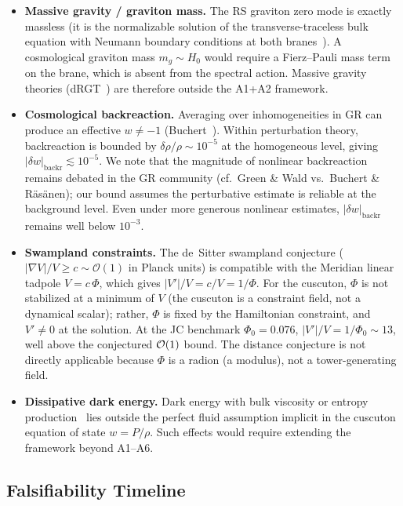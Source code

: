 \begin{itemize}
  \item \textbf{Massive gravity / graviton mass.} The RS graviton zero mode is exactly massless (it is the normalizable solution of the transverse-traceless bulk equation with Neumann boundary conditions at both branes~\cite{ch3:randall-sundrum1999}). A cosmological graviton mass $m_g \sim H_0$ would require a Fierz--Pauli mass term on the brane, which is absent from the spectral action. Massive gravity theories (dRGT~\cite{ch3:deRhamGabadadzeTolley2011}) are therefore outside the A1+A2 framework.

  \item \textbf{Cosmological backreaction.} Averaging over inhomogeneities in GR can produce an effective $w \neq -1$ (Buchert~\cite{ch3:buchert2000,ch3:buchert2008}). Within perturbation theory, backreaction is bounded by $\delta\rho/\rho \sim 10^{-5}$ at the homogeneous level, giving $|\delta w|_{\mathrm{backr}} \lesssim 10^{-5}$. We note that the magnitude of nonlinear backreaction remains debated in the GR community (cf.\ Green \& Wald vs.\ Buchert \& R\"as\"anen); our bound assumes the perturbative estimate is reliable at the background level. Even under more generous nonlinear estimates, $|\delta w|_{\mathrm{backr}}$ remains well below $10^{-3}$.

  \item \textbf{Swampland constraints.} The de~Sitter swampland conjecture ($|\nabla V|/V \geq c \sim \mathcal{O}(1)$ in Planck units) is compatible with the Meridian linear tadpole $V = c\,\Phi$, which gives $|V'|/V = c/V = 1/\Phi$. For the cuscuton, $\Phi$ is not stabilized at a minimum of $V$ (the cuscuton is a constraint field, not a dynamical scalar); rather, $\Phi$ is fixed by the Hamiltonian constraint, and $V' \neq 0$ at the solution. At the JC benchmark $\Phi_0 = 0.076$, $|V'|/V = 1/\Phi_0 \sim 13$, well above the conjectured $\mathcal{O}\!\left(1\right)$ bound. The distance conjecture is not directly applicable because $\Phi$ is a radion (a modulus), not a tower-generating field.

  \item \textbf{Dissipative dark energy.} Dark energy with bulk viscosity or entropy production~\cite{ch3:brevik2017} lies outside the perfect fluid assumption implicit in the cuscuton equation of state $w = P/\rho$. Such effects would require extending the framework beyond A1--A6.
\end{itemize}

\subsection{Falsifiability Timeline}
\label{sec:3-falsifiability}

